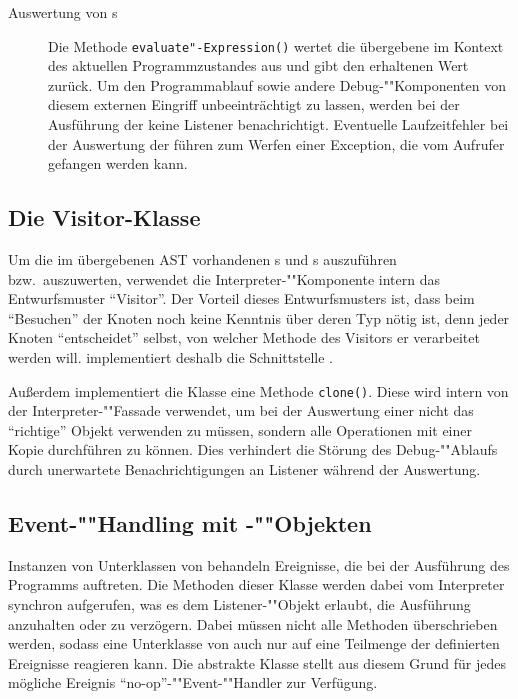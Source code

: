 \begin{description}
    \item[Auswertung von s]
    Die Methode \texttt{evaluate"-Expression()} wertet die übergebene  im Kontext des aktuellen Programmzustandes aus und gibt den erhaltenen Wert zurück. Um den Programmablauf sowie andere Debug-""Komponenten von diesem externen Eingriff unbeeinträchtigt zu lassen, werden bei der Ausführung der  keine Listener benachrichtigt. Eventuelle Laufzeitfehler bei der Auswertung der  führen zum Werfen einer Exception, die vom Aufrufer gefangen werden kann.
\end{description}

\subsection{Die Visitor-Klasse }
Um die im übergebenen AST vorhandenen s und s auszuführen bzw.\ auszuwerten, verwendet die Interpreter-""Komponente intern das Entwurfsmuster ``Visitor''. Der Vorteil dieses Entwurfsmusters ist, dass beim ``Besuchen'' der Knoten noch keine Kenntnis über deren Typ nötig ist, denn jeder Knoten ``entscheidet'' selbst, von welcher Methode des Visitors er verarbeitet werden will.  implementiert deshalb die Schnittstelle .

Außerdem implementiert die Klasse  eine Methode \texttt{clone()}. Diese wird intern von der Interpreter-""Fassade verwendet, um bei der Auswertung einer  nicht das ``richtige'' Objekt verwenden zu müssen, sondern alle Operationen mit einer Kopie durchführen zu können. Dies verhindert die Störung des Debug-""Ablaufs durch unerwartete Benachrichtigungen an Listener während der Auswertung.

\subsection{Event-""Handling mit -""Objekten}
Instanzen von Unterklassen von  behandeln Ereignisse, die bei der Ausführung des Programms auftreten. Die Methoden dieser Klasse werden dabei vom Interpreter synchron aufgerufen, was es dem Listener-""Objekt erlaubt, die Ausführung anzuhalten oder zu verzögern. Dabei müssen nicht alle Methoden überschrieben werden, sodass eine Unterklasse von  auch nur auf eine Teilmenge der definierten Ereignisse reagieren kann. Die abstrakte Klasse  stellt aus diesem Grund für jedes mögliche Ereignis ``no-op''-""Event-""Handler zur Verfügung.

